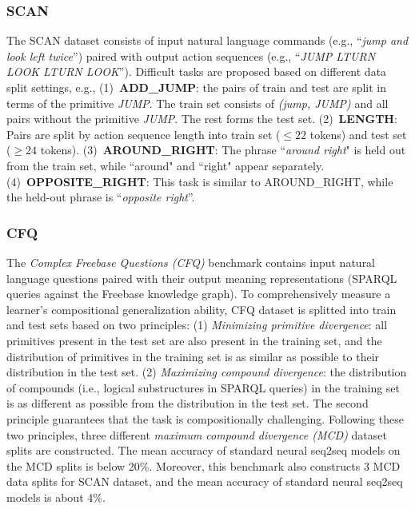 \documentclass[letterpaper]{article} %
\begin{document}
\subsubsection{SCAN}
The SCAN dataset consists of input natural language commands (e.g., ``\emph{jump and look left twice}'') paired with output action sequences (e.g., ``\emph{JUMP LTURN LOOK LTURN LOOK}'').
Difficult tasks are proposed based on different data split settings, e.g.,
(1)~\textbf{ADD\_JUMP}: the pairs of train and test are split in terms of the primitive \emph{JUMP}.
The train set consists of \emph{(jump, JUMP)} and all pairs without the primitive \emph{JUMP}.
The rest forms the test set.
(2)~\textbf{LENGTH}: Pairs are split by action sequence length into train set ($\leq 22$ tokens) and test set ($\geq 24$ tokens). (3)~\textbf{AROUND\_RIGHT}: The phrase ``\emph{around right}" is held out from the train set, while ``around" and ``right" appear separately.
(4)~\textbf{OPPOSITE\_RIGHT}: This task is similar to AROUND\_RIGHT, while the held-out phrase is ``\emph{opposite right}''.

\subsubsection{CFQ}
The \emph{Complex Freebase Questions (CFQ)} benchmark \cite{keysers2020measuring} contains input natural language questions paired with their output meaning representations (SPARQL queries against the Freebase knowledge graph).
To comprehensively measure a learner's compositional generalization ability, CFQ dataset is splitted into train and test sets based on two principles:
(1) \emph{Minimizing primitive divergence}: all primitives present in the test set are also present in the training set, and the distribution of primitives in the training set is as similar as possible to their distribution in the test set.
(2) \emph{Maximizing compound divergence}: the distribution of compounds (i.e., logical substructures in SPARQL queries) in the training set is as different as possible from the distribution in the test set.
The second principle guarantees that the task is compositionally challenging.
Following these two principles, three different \emph{maximum compound divergence (MCD)} dataset splits are constructed.
The mean accuracy of standard neural seq2seq models on the MCD splits is below 20\%.
Moreover, this benchmark also constructs 3 MCD data splits for SCAN dataset, and the mean accuracy of standard neural seq2seq models is about 4\%.
\end{document}
